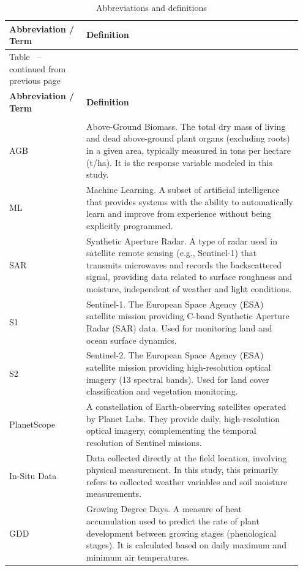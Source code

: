 \documentclass[
  english,
  review,
  number,
  sort,compress,
  authoryear,
  3p]{elsarticle}
\renewcommand*\tablename{Table}
\newcommand\tablename{Table}
\begin{document}
\begin{longtable}{>{\raggedright\arraybackslash}p{0.25\linewidth}>{\raggedright\arraybackslash}p{0.70\linewidth}}
\caption{Abbreviations and definitions} \label{tab:glossary} \\
\toprule
\textbf{Abbreviation / Term} & \textbf{Definition} \\
\midrule
\endfirsthead
\multicolumn{2}{c}%
{{\tablename\ \thetable{} -- continued from previous page}} \\
\toprule
\textbf{Abbreviation / Term} & \textbf{Definition} \\
\midrule
\endhead
\midrule
\multicolumn{2}{r}{{Continued on next page}} \\
\endfoot
\bottomrule
\endlastfoot
AGB & Above-Ground Biomass. The total dry mass of living and dead above-ground plant organs (excluding roots) in a given area, typically measured in tons per hectare (t/ha). It is the response variable modeled in this study. \\
ML & Machine Learning. A subset of artificial intelligence that provides systems with the ability to automatically learn and improve from experience without being explicitly programmed. \\
SAR & Synthetic Aperture Radar. A type of radar used in satellite remote sensing (e.g., Sentinel-1) that transmits microwaves and records the backscattered signal, providing data related to surface roughness and moisture, independent of weather and light conditions. \\
S1 & Sentinel-1. The European Space Agency (ESA) satellite mission providing C-band Synthetic Aperture Radar (SAR) data. Used for monitoring land and ocean surface dynamics. \\
S2 & Sentinel-2. The European Space Agency (ESA) satellite mission providing high-resolution optical imagery (13 spectral bands). Used for land cover classification and vegetation monitoring. \\
PlanetScope & A constellation of Earth-observing satellites operated by Planet Labs. They provide daily, high-resolution optical imagery, complementing the temporal resolution of Sentinel missions. \\
In-Situ Data & Data collected directly at the field location, involving physical measurement. In this study, this primarily refers to collected weather variables and soil moisture measurements. \\
GDD & Growing Degree Days. A measure of heat accumulation used to predict the rate of plant development between growing stages (phenological stages). It is calculated based on daily maximum and minimum air temperatures. \\

\end{longtable}
\end{document}
